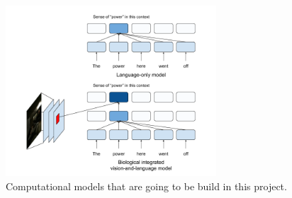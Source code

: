 \documentclass[letterpaper, 12pt]{article}
\begin{document}
\begin{figure}[h]
\begin{center}
\includegraphics[width=0.7\textwidth,keepaspectratio]{model_figure}
\end{center}
    \caption{Computational models that are going to be build in this project.}
\end{figure}

\newpage
% 

\end{document}

